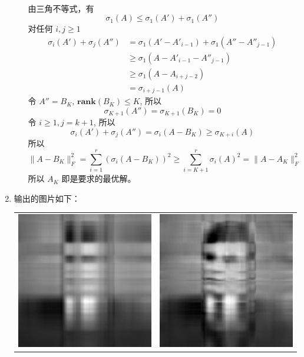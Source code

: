 \documentclass[11pt,letter,notitlepage]{article}
\newcommand{\rank}[1]{ \textbf{rank}  (#1)  }
\begin{document}
\begin{solution}
\begin{enumerate}
\begin{enumerate}
$$\begin{aligned}
                        \end{aligned}$$
                        由三角不等式，有
                        $$\sigma_1(A)\leq \sigma_1(A')+\sigma_1(A'')$$
                        对任何 $i,j\geq1$
                        $$\begin{aligned}
                            \sigma _{i}(A')+\sigma _{j}(A'')&=\sigma _{1}(A'-A'_{i-1})+\sigma _{1}(A''-A''_{j-1})\\&\geq \sigma _{1}(A-A'_{i-1}-A''_{j-1})\\&\geq \sigma _{1}(A-A_{i+j-2})\qquad\\&=\sigma _{i+j-1}(A)
                        \end{aligned}$$
                        令 $A''=B_K$, $\rank{B_K}\leq K$, 所以 
                        $$\sigma_{K+1}(A'')=\sigma_{K+1}(B_K)=0$$
                        令 $i \geq 1, j=k+1$, 所以 
                        $$\sigma _{i}(A')+\sigma _{j}(A'')=\sigma_i(A-B_K)\geq\sigma_{K+i}(A)$$
                        所以
                        $$\|A-B_K\|_F^2=\sum_{i=1}^r \left( \sigma_i(A-B_K)\right)^2 \geq \sum_{i=K+1}^r \sigma_i(A)^2=\|A-A_K\|_F^2$$
                        所以 $A_K$ 即是要求的最优解。
              \end{enumerate}
        \item 输出的图片如下：\\
              \begin{center}
                  \begin{tabular}{cc}
                      \includegraphics[width=0.3\columnwidth]{solution7.4_img/Alan_Turing_k=2.pdf}
                              & \includegraphics[width=0.3\columnwidth]{solution7.4_img/Alan_Turing_k=4.pdf}   \\

\end{tabular}
\end{center}
\end{enumerate}
\end{solution}
\end{document}
